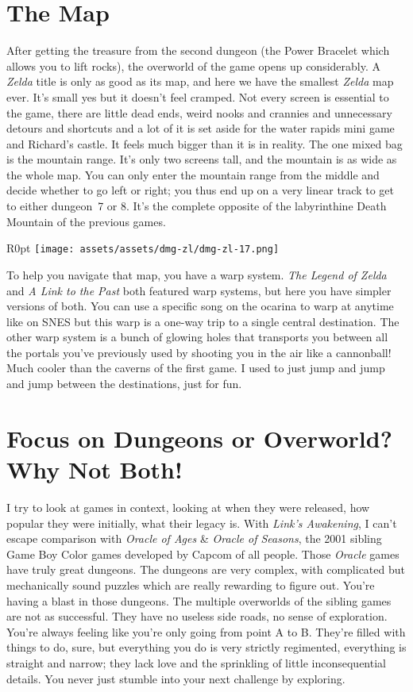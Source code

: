 \documentclass{book}
\begin{document}
\FloatBarrier\needspace{10mm}\section*{The Map}\nopagebreak[4]

After getting the treasure from the second dungeon (the Power Bracelet which allows you to lift rocks), the overworld of the game opens up considerably. A \emph{Zelda} title is only as good as its map, and here we have the smallest \emph{Zelda} map ever. It’s small yes but it doesn’t feel cramped. Not every screen is essential to the game, there are little dead ends, weird nooks and crannies and unnecessary detours and shortcuts and a lot of it is set aside for the water rapids mini game and Richard’s castle. It feels much bigger than it is in reality. The one mixed bag is the mountain range. It’s only two screens tall, and the mountain is as wide as the whole map. You can only enter the mountain range from the middle and decide whether to go left or right; you thus end up on a very linear track to get to either dungeon~7 or 8. It’s the complete opposite of the labyrinthine Death Mountain of the previous games.

\begin{wrapfigure}{R}{0pt} \texttt{[image: assets/assets/dmg-zl/dmg-zl-17.png]}\end{wrapfigure}
To help you navigate that map, you have a warp system. \emph{The Legend of Zelda} and \emph{A Link to the Past} both featured warp systems, but here you have simpler versions of both. You can use a specific song on the ocarina to warp at anytime like on SNES but this warp is a one-way trip to a single central destination. The other warp system is a bunch of glowing holes that transports you between all the portals you’ve previously used by shooting you in the air like a cannonball! Much cooler than the caverns of the first game. I used to just jump and jump and jump between the destinations, just for fun.

\FloatBarrier\needspace{10mm}\section*{Focus on Dungeons or Overworld? Why Not Both!}\nopagebreak[4]

I try to look at games in context, looking at when they were released, how popular they were initially, what their legacy is. With \emph{Link’s Awakening}, I can’t escape comparison with \emph{Oracle of Ages} \& \emph{Oracle of Seasons}, the 2001 sibling Game Boy Color games developed by Capcom of all people. Those \emph{Oracle} games have truly great dungeons. The dungeons are very complex, with complicated but mechanically sound puzzles which are really rewarding to figure out. You’re having a blast in those dungeons. The multiple overworlds of the sibling games are not as successful. They have no useless side roads, no sense of exploration. You’re always feeling like you’re only going from point A to B. They’re filled with things to do, sure, but everything you do is very strictly regimented, everything is straight and narrow; they lack love and the sprinkling of little inconsequential details. You never just stumble into your next challenge by exploring.
\end{document}
